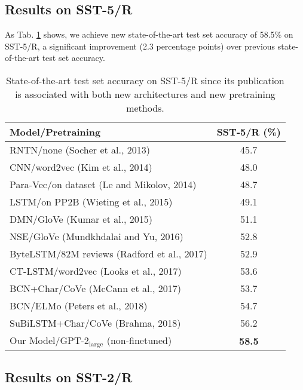 \documentclass[11pt,a4paper]{article}
\begin{document}
\subsection{Results on SST-5/R}

As Tab. \ref{tab:SST5R} shows, we achieve new state-of-the-art test set accuracy of 58.5\% on SST-5/R, a significant improvement (2.3 percentage points) over previous state-of-the-art test set accuracy.

\begin{table}[h]
	\small
	\begin{center}
		\begin{tabular}{@{}lc@{}}
			\toprule
			\bf Model/Pretraining & \bf SST-5/R (\%) \\
			\midrule
			RNTN/{\scriptsize none} (Socher et al., 2013) & 45.7 \\
			CNN/{\scriptsize word2vec} (Kim et al., 2014) & 48.0 \\
			Para-Vec/{\scriptsize on dataset} (Le and Mikolov, 2014) & 48.7 \\
			LSTM/{\scriptsize on PP2B} (Wieting et al., 2015) & 49.1 \\
			DMN/{\scriptsize GloVe} (Kumar et al., 2015) & 51.1 \\
			NSE/{\scriptsize GloVe} (Mundkhdalai and Yu, 2016) & 52.8 \\
			ByteLSTM/{\scriptsize 82M reviews} (Radford et al., 2017) & 52.9 \\
			CT-LSTM/{\scriptsize word2vec} (Looks et al., 2017) & 53.6 \\
			BCN+Char/{\scriptsize CoVe} (McCann et al., 2017) & 53.7 \\
			BCN/{\scriptsize ELMo} (Peters et al., 2018) & 54.7 \\
			SuBiLSTM+Char/{\scriptsize CoVe} (Brahma, 2018) & 56.2 \\
			Our Model/{\scriptsize GPT-2$_\text{large}$ (non-finetuned)} & \bf 58.5 \\
			\bottomrule
		\end{tabular}
	\end{center}
	\caption{\label{tab:SST5R}State-of-the-art test set accuracy on SST-5/R since its publication is associated with both new architectures and new pretraining methods.}
\end{table}

\subsection{Results on SST-2/R}
\end{document}

